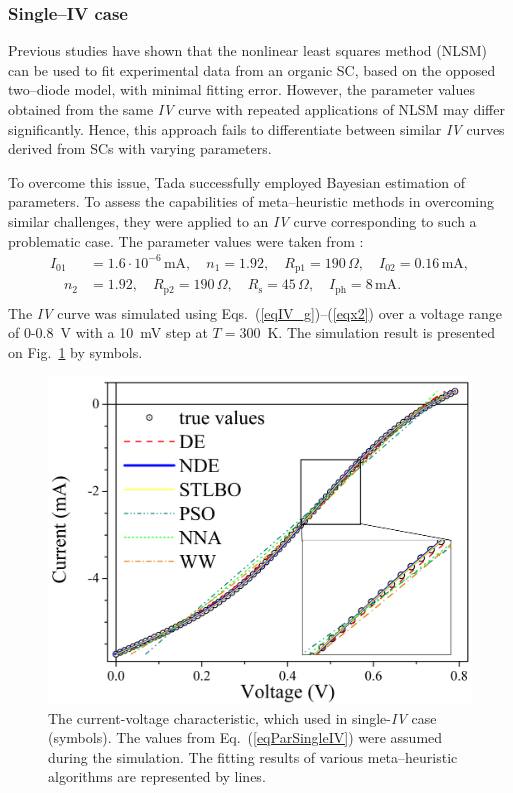 \documentclass[a4paper,fleqn]{cas-sc}
\begin{document}
\subsubsection{Single--IV case}\label{SingleIV}

Previous studies \cite{Tada2015Organic,Tada2021} have shown that the nonlinear least squares method (NLSM) can be used to fit experimental data from an organic SC,
based on the opposed two--diode model, with minimal fitting error.
However, the parameter values obtained from the same \emph{IV} curve with repeated applications of NLSM may differ significantly.
Hence, this approach fails to differentiate between similar \emph{IV} curves derived from SCs with varying parameters.

To overcome this issue, Tada \cite{Tada2021} successfully employed Bayesian estimation of parameters.
To assess the capabilities of meta--heuristic methods in overcoming similar challenges,
they were applied to an \emph{IV} curve corresponding to such a problematic case.
The parameter values were taken from \cite{Tada2021}:
\begin{equation}
\label{eqParSingleIV}
\begin{split}
I_{01}&=1.6\cdot10^{-6}\,\text{mA},\quad n_1=1.92,\quad R_\mathrm{p1}=190\,\Omega,\quad I_{02}=0.16\,\text{mA},\\
\quad n_2&=1.92, \quad R_\mathrm{p2}=190\,\Omega,\quad R_\mathrm{s}=45\,\Omega,\quad I_\mathrm{ph}=8\,\text{mA}.\\
\end{split}
\end{equation}
The \emph{IV} curve was simulated using Eqs.~(\ref{eqIV_g})--(\ref{eqx2}) over a voltage range of 0-0.8~V with a 10~mV step at $T=300$~K.
The simulation result is presented on Fig.~\ref{figSigleIV} by symbols.

\begin{figure}[]
	\centering
		\includegraphics[width=0.5\columnwidth]{Fig2}
	  \caption{The current-voltage characteristic, which used in single-\emph{IV} case (symbols).
        The values from Eq.~(\ref{eqParSingleIV}) were assumed during the simulation.
        The fitting results of various meta--heuristic algorithms are represented by lines.}\label{figSigleIV}
\end{figure}
\end{document}

